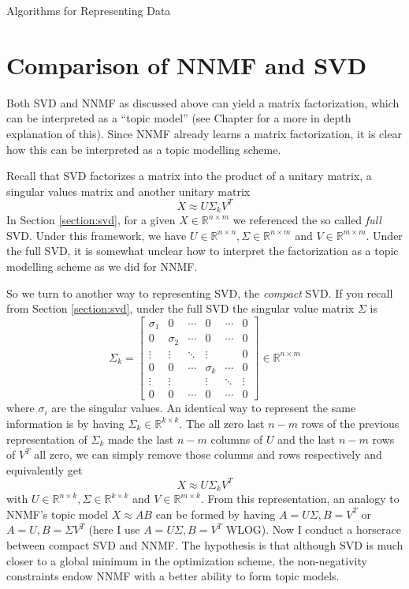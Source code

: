 \documentclass[12pt]{pom_thesis}
\begin{document}
\begin{chapter}{Algorithms for Representing Data}
\section{Comparison of NNMF and SVD}
Both SVD and NNMF as discussed above can yield a matrix factorization, which can be interpreted as a ``topic model'' (see Chapter \label{natlang} for a more in depth explanation of this). Since NNMF already learns a matrix factorization, it is clear how this can be interpreted as a topic modelling scheme. 

Recall that SVD factorizes a matrix into the product of a unitary matrix, a singular values matrix and another unitary matrix
$$X \approx U \Sigma_k V^T$$
In Section \ref{section:svd}, for a given $X \in \mathbb{R}^{n \times m}$ we referenced the so called \textit{full} SVD. Under this framework, we have $U \in \mathbb{R}^{n \times n}, \Sigma  \in \mathbb{R}^{n \times m}$ and $V \in \mathbb{R}^{m \times m}$. Under the full SVD, it is somewhat unclear how to interpret the factorization as a topic modelling scheme as we did for NNMF. 

So we turn to another way to representing SVD, the \textit{compact} SVD. If you recall from Section \ref{section:svd}, under the full SVD the singular value matrix $\Sigma$ is 
$$\Sigma_k = \begin{bmatrix}
\sigma_1  & 0     & \cdots      &0       &   \cdots & 0   \\
0  & \sigma_2 & \cdots & 0    &  \cdots & 0    \\
\vdots  & \vdots & \ddots & \vdots &  & 0   \\
0 & 0 & \cdots & \sigma_k  & \cdots & 0  \\
\vdots  &     \vdots    && \vdots & \ddots & \vdots  \\
0 & 0      &      \cdots  &0      & \cdots & 0 
\end{bmatrix} \in \mathbb{R}^{n \times m}$$
where $\sigma_i$ are the singular values. An identical way to represent the same information is by having $\Sigma_k \in\mathbb{R}^{k \times k }$.  The all zero last $n-m$ rows of the previous representation of $\Sigma_k$ made the last $n-m$ columns of $U$ and the last $n-m$ rows of $V^T$ all zero, we can simply remove those columns and rows respectively and equivalently get  
$$X \approx U \Sigma_k V^T$$
with  $U \in \mathbb{R}^{n \times k}, \Sigma  \in \mathbb{R}^{k \times k}$ and $V \in \mathbb{R}^{m \times k}$. From this representation, an analogy to NNMF's topic model $X \approx AB$ can be formed by having $A = U\Sigma, B = V^T$ or $A = U, B=\Sigma V^T$ (here I use $A = U\Sigma, B = V^T$ WLOG). Now I conduct a horserace between compact SVD and NNMF. The hypothesis is that although SVD is much closer to a global minimum in the optimization scheme, the non-negativity constraints endow NNMF with a better ability to form topic models.

\end{chapter}
\end{document}
